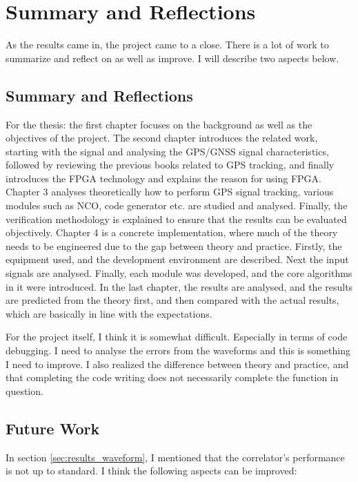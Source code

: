 \myClearDoublePage
\chapter{Summary and Reflections}
As the results came in, the project came to a close. There is a lot of work to summarize and reflect on as well as improve. I will describe two aspects below.

\section{Summary and Reflections}
For the thesis: the first chapter focuses on the background as well as the objectives of the project. The second chapter introduces the related work, starting with the signal and analysing the GPS/GNSS signal characteristics, followed by reviewing the previous books related to GPS tracking, and finally introduces the FPGA technology and explains the reason for using FPGA. Chapter 3 analyses theoretically how to perform GPS signal tracking, various modules such as NCO, code generator etc. are studied and analysed. Finally, the verification methodology is explained to ensure that the results can be evaluated objectively. Chapter 4 is a concrete implementation, where much of the theory needs to be engineered due to the gap between theory and practice. Firstly, the equipment used, and the development environment are described. Next the input signals are analysed. Finally, each module was developed, and the core algorithms in it were introduced. In the last chapter, the results are analysed, and the results are predicted from the theory first, and then compared with the actual results, which are basically in line with the expectations.

For the project itself, I think it is somewhat difficult. Especially in terms of code debugging. I need to analyse the errors from the waveforms and this is something I need to improve. I also realized the difference between theory and practice, and that completing the code writing does not necessarily complete the function in question.

\section{Future Work}
In section \ref{sec:results_waveform}, I mentioned that the correlator's performance is not up to standard. I think the following aspects can be improved:

